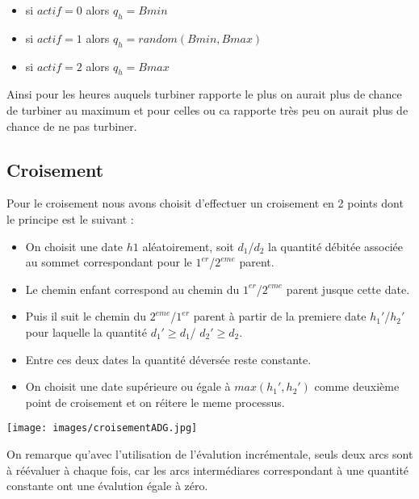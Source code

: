 \documentclass[a4paper]{report}
\begin{document}
 \begin{itemize}
   \item si $actif=0$ alors $q_h=Bmin$ 
   \item si $actif=1$ alors $q_h=random(Bmin,Bmax)$
   \item si $actif=2$ alors $q_h=Bmax$  
 \end{itemize} 
 Ainsi pour les heures auquels turbiner rapporte le plus on aurait plus de chance de turbiner au maximum et pour celles ou ca rapporte très peu on aurait plus de chance de ne pas turbiner.\\
\subsection*{Croisement}
Pour le croisement nous avons choisit d'effectuer un croisement en 2 points dont le principe est le suivant : \\
\begin{itemize}
\item On choisit une date $h1$ aléatoirement, soit $d_1$/$d_2$ la quantité débitée associée au sommet correspondant pour le $1^{er}$/$2^{eme}$ parent.
\item Le chemin enfant correspond au chemin du $1^{er}$/$2^{eme}$ parent jusque cette date.



\item Puis il suit le chemin du $2^{eme}$/$1^{er}$  parent à partir de la premiere date $h_1'$/$h_2'$ pour laquelle  la quantité $d_1' \geq d_1$/ $d_2' \geq d_2$.
\item Entre ces deux dates la quantité déversée reste constante.
\item On choisit une date supérieure ou égale à $max(h_1',h_2')$ comme deuxième point de croisement et on réitere le meme processus.
\end{itemize}
\begin{center}
  \texttt{[image: images/croisementADG.jpg]}
\end{center}
 On remarque qu'avec l'utilisation de l'évalution incrémentale, seuls deux arcs sont à réévaluer à chaque fois, car les arcs intermédiares correspondant à une quantité constante ont une évalution égale à zéro.
\end{document}
